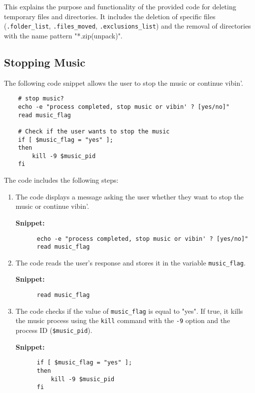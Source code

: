 \documentclass[12pt]{article}
\begin{document}
    This explains the purpose and functionality of the provided code for deleting temporary files and directories. It includes the deletion of specific files (\texttt{.folder\_list}, \texttt{.files\_moved}, \texttt{.exclusions\_list}) and the removal of directories with the name pattern "*.zip(unpack)".

    \subsection{Stopping Music}

    The following code snippet allows the user to stop the music or continue vibin'.
    
    \begin{verbatim}
    # stop music?
    echo -e "process completed, stop music or vibin' ? [yes/no]"
    read music_flag
    
    # Check if the user wants to stop the music
    if [ $music_flag = "yes" ];
    then
        kill -9 $music_pid
    fi
    \end{verbatim}
    
    The code includes the following steps:
    
    \begin{enumerate}
      \item The code displays a message asking the user whether they want to stop the music or continue vibin'.
      
      \textbf{Snippet:}
      \begin{verbatim}
      echo -e "process completed, stop music or vibin' ? [yes/no]"
      read music_flag
      \end{verbatim}
      
      \item The code reads the user's response and stores it in the variable \texttt{music\_flag}.
      
      \textbf{Snippet:}
      \begin{verbatim}
      read music_flag
      \end{verbatim}
      
      \item The code checks if the value of \texttt{music\_flag} is equal to "yes". If true, it kills the music process using the \texttt{kill} command with the \texttt{-9} option and the process ID (\texttt{\$music\_pid}).
      
      \textbf{Snippet:}
      \begin{verbatim}
      if [ $music_flag = "yes" ];
      then
          kill -9 $music_pid
      fi
      \end{verbatim}
    \end{enumerate}
    
\end{document}
